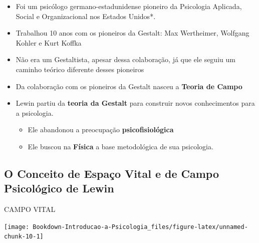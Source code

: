 \documentclass[
]{book}
\providecommand{\tightlist}{%
  \setlength{\itemsep}{0pt}\setlength{\parskip}{0pt}}
\begin{document}
\begin{itemize}
\tightlist
\item
  Foi um psicólogo germano-estadunidense pioneiro da Psicologia Aplicada, Social e Organizacional nos Estados Unidos*.
\item
  Trabalhou 10 anos com os pioneiros da Gestalt: Max Wertheimer, Wolfgang Kohler e Kurt Koffka
\item
  Não era um Gestaltista, apesar dessa colaboração, já que ele seguiu um caminho teórico diferente desses pioneiros
\item
  Da colaboração com os pioneiros da Gestalt nasceu a \textbf{Teoria de Campo}
\item
  Lewin partiu da \textbf{teoria da Gestalt} para construir novos conhecimentos para a psicologia.

  \begin{itemize}
  \tightlist
  \item
    Ele abandonou a preocupação \textbf{psicofisiológica}
  \item
    Ele buscou na \textbf{Física} a base metodológica de sua psicologia.
  \end{itemize}
\end{itemize}

\hypertarget{o-conceito-de-espauxe7o-vital-e-de-campo-psicoluxf3gico-de-lewin}{%
\subsection{\texorpdfstring{O Conceito de \textbf{Espaço Vital} e de \textbf{Campo Psicológico} de Lewin}{O Conceito de Espaço Vital e de Campo Psicológico de Lewin}}\label{o-conceito-de-espauxe7o-vital-e-de-campo-psicoluxf3gico-de-lewin}}

CAMPO VITAL

\texttt{[image: Bookdown-Introducao-a-Psicologia\_files/figure-latex/unnamed-chunk-10-1]}
\end{document}
